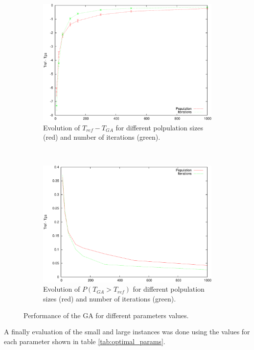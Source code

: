 \documentclass[10pt,a4paper]{article}
\begin{document}
\begin{figure}[h]
\begin{subfigure}[b]{0.45\textwidth}
\includegraphics[width=\textwidth]{results_pop_it_diff.pdf}
\caption{Evolution of $T_{ref}-T_{GA}$ for different polpulation sizes (red) and number of iterations (green).}
\label{fig:evol_pop_it_diff}
\end{subfigure}
~
\begin{subfigure}[b]{0.45\textwidth}
\centering
\includegraphics[width=\textwidth]{results_pop_it_worse.pdf}
\caption{Evolution of $P(T_{GA} > T_{ref})$ for different polpulation sizes (red) and number of iterations (green).}
\label{fig:evol_pop_it_worse}
\end{subfigure}
\caption{Performance of the GA for different parameters values.}
\end{figure}

A finally evaluation of the small and large instances was done using the values for each parameter shown in table \ref{tab:optimal_params}.
\end{document}
